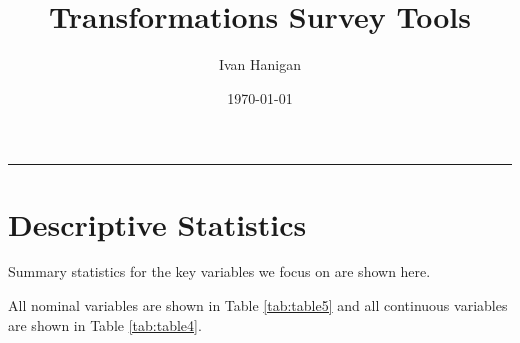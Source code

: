 \documentclass[a4paper]{article}
\title{Transformations Survey Tools}
\author{Ivan Hanigan}
\date{\today}
\begin{document}
\maketitle

\tableofcontents
\hrule

\section{Descriptive Statistics}
\label{sec-1}

Summary statistics for the key variables we focus on are shown here.

All nominal variables are shown in Table \ref{tab:table5} and all continuous variables are shown in Table \ref{tab:table4}.   



\end{document}
